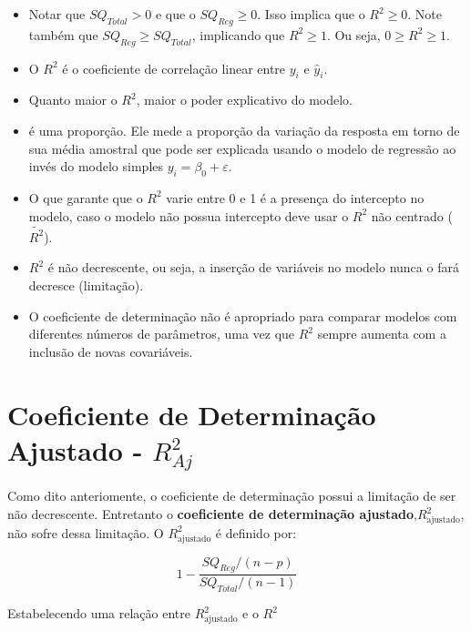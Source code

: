 \begin{itemize}

\item Notar que $SQ_{Total} > 0$ e que o $SQ_{Reg} \geq 0$. Isso implica que o $R^2 \geq 0$. Note também que $SQ_{Reg} \geq SQ_{Total}$, implicando que $R^2 \geq 1$. Ou seja, $\boxed{0 \geq R^2 \geq 1}$.

\item O $R^2$ é o coeficiente de correlação linear entre $y_i$ e $\hat{y}_i$.

\item Quanto maior o $R^2$, maior o poder explicativo do modelo.

\item é uma proporção. Ele mede a proporção da variação da resposta em torno de sua média amostral que pode ser explicada usando o modelo de regressão ao invés do modelo simples $y_i = \beta_0 + \varepsilon$.

\item O que garante que o $R^2$ varie entre 0 e 1 é a presença do intercepto no modelo, caso o modelo não possua intercepto deve usar o $R^2$ não centrado ($\tilde{R^2}$).

\item $R^2$ é não decrescente, ou seja, a inserção de variáveis no modelo nunca o fará decresce (limitação).

\item O coeficiente de determinação não é apropriado para comparar modelos com diferentes números de parâmetros, uma vez que $R^2$ sempre aumenta com a inclusão de novas covariáveis.
\end{itemize}

\section{Coeficiente de Determinação Ajustado - $R^2_{Aj}$}
\label{ch:r2a}

\noindent Como dito anteriomente, o coeficiente de determinação possui a limitação de ser não decrescente. Entretanto o \textbf{coeficiente de determinação ajustado},$R^2_{\text{ajustado}}$, não sofre dessa limitação. O $R^2_{\text{ajustado}}$ é definido por:

\begin{equation}
    \label{eq:eq53}
    1 - \dfrac{SQ_{Reg}/(n-p)}{SQ_{Total}/(n-1)}
\end{equation}

\noindent Estabelecendo uma relação entre $R^2_{\text{ajustado}}$ e o $R^2$

